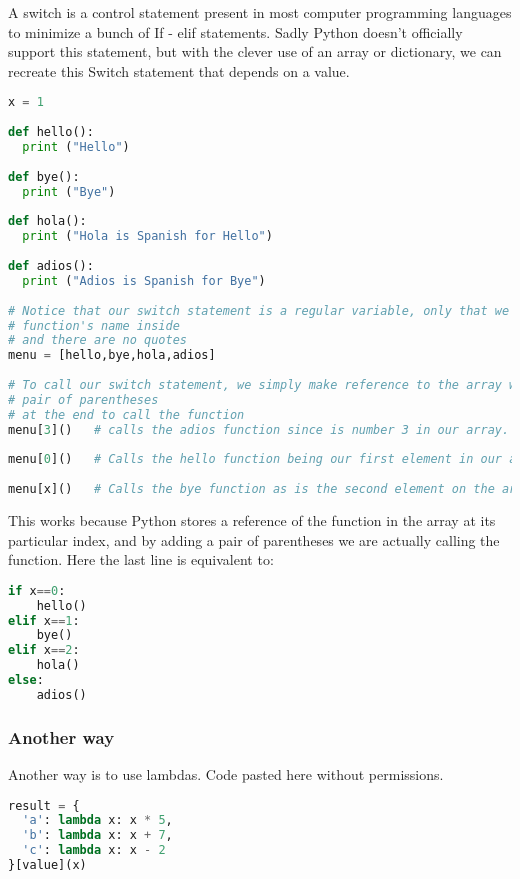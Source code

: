A switch is a control statement present in most computer programming languages
to minimize a bunch of If - elif statements. Sadly Python doesn't officially
support this statement, but with the clever use of an array or dictionary, we
can recreate this Switch statement that depends on a value.
\lstset{basicstyle=\scriptsize, numbers=left, captionpos=b, tabsize=4}
\begin{lstlisting}[caption=Switch Case,language={Python},
xleftmargin=15pt, label=lst:switchcase]
x = 1
 
def hello():
  print ("Hello")
 
def bye():
  print ("Bye")
 
def hola():
  print ("Hola is Spanish for Hello")
 
def adios():
  print ("Adios is Spanish for Bye")
 
# Notice that our switch statement is a regular variable, only that we added the
# function's name inside
# and there are no quotes
menu = [hello,bye,hola,adios]
 
# To call our switch statement, we simply make reference to the array with a
# pair of parentheses
# at the end to call the function
menu[3]()   # calls the adios function since is number 3 in our array.
 
menu[0]()   # Calls the hello function being our first element in our array.
 
menu[x]()   # Calls the bye function as is the second element on the array x = 1
\end{lstlisting}
This works because Python stores a reference of the function in the array at its
particular index, and by adding a pair of parentheses we are actually calling
the function. Here the last line is equivalent to:
\lstset{basicstyle=\scriptsize, numbers=left, captionpos=b, tabsize=4}
\begin{lstlisting}[caption=Swicht Case Function,language={Python},
xleftmargin=15pt, label=lst:swichtcasefunction]
if x==0:
    hello()
elif x==1:
    bye()
elif x==2:
    hola()
else:
    adios()
\end{lstlisting}
\subsubsection{Another way}
Another way is to use lambdas. Code pasted here without permissions.
\lstset{basicstyle=\scriptsize, numbers=left, captionpos=b, tabsize=4}
\begin{lstlisting}[caption=Switch Case Lambda,language={Python},
xleftmargin=15pt, label=lst:switchcaselambda]
result = {
  'a': lambda x: x * 5,
  'b': lambda x: x + 7,
  'c': lambda x: x - 2
}[value](x)
\end{lstlisting}

